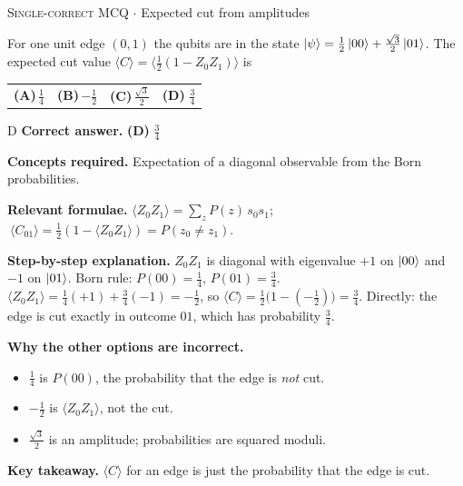\documentclass[11pt,a4paper]{article}
\newcommand{\optlabel}[1]{\textbf{(#1)}}
\newcommand{\correctlabel}[1]{\textcolor{okgreen}{\textbf{(#1)}\,\ding{51}}}
\newenvironment{qitem}[1]{\begin{list}{}{\setlength{\leftmargin}{3.3em}\setlength{\labelwidth}{3.1em}%
  \setlength{\labelsep}{0.2em}\setlength{\topsep}{3pt}\setlength{\parsep}{3pt}}\item[\textbf{Q.#1}\hfill]}{\end{list}}
\newcommand{\qsep}{\par\vspace{2pt}{\color{black!15}\hrule}\vspace{4pt}}
\newcommand{\qmeta}[2]{{\footnotesize\color{black!60}\textsc{#1} \;$\cdot$\; #2}\par}
\begin{document}
\begin{qitem}{25}
\qmeta{Single-correct MCQ}{Expected cut from amplitudes}
For one unit edge $(0,1)$ the qubits are in the state $\ket\psi = \tfrac12\ket{00} + \tfrac{\sqrt3}{2}\ket{01}$. The expected
cut value $\langle C\rangle = \big\langle \tfrac12(1 - Z_0Z_1)\big\rangle$ is
\par\smallskip\noindent\begin{tabularx}{\linewidth}{@{}*{4}{L}@{}}
\optlabel{A}\,$\tfrac14$ & \optlabel{B}\,$-\tfrac12$ & \optlabel{C}\,$\tfrac{\sqrt3}{2}$ & \correctlabel{D}\,$\tfrac34$
\end{tabularx}
\end{qitem}
\begin{solbox}{D}
\textbf{\color{brand}Correct answer.} \textcolor{okgreen}{\textbf{(D)}} $\tfrac34$

\textbf{\color{brand}Concepts required.} Expectation of a diagonal observable from the Born probabilities.

\textbf{\color{brand}Relevant formulae.} $\langle Z_0Z_1\rangle = \sum_z P(z)\,s_0s_1$; $\ \langle C_{01}\rangle = \tfrac12(1 - \langle Z_0Z_1\rangle) = P(z_0\neq z_1)$.

\textbf{\color{brand}Step-by-step explanation.} $Z_0Z_1$ is diagonal with eigenvalue $+1$ on $\ket{00}$ and $-1$ on $\ket{01}$. Born rule: $P(00) = \tfrac14$, $P(01) = \tfrac34$.
$\langle Z_0Z_1\rangle = \tfrac14(+1) + \tfrac34(-1) = -\tfrac12$, so $\langle C\rangle = \tfrac12\big(1 - (-\tfrac12)\big) = \tfrac34$.
Directly: the edge is cut exactly in outcome $01$, which has probability $\tfrac34$.

\textbf{\color{brand}Why the other options are incorrect.}
\begin{itemize}[leftmargin=2.4em, itemsep=1pt, topsep=2pt]
\item[\textbf{(A)}] $\frac14$ is $P(00)$, the probability that the edge is \emph{not} cut.
\item[\textbf{(B)}] $-\frac12$ is $\langle Z_0Z_1\rangle$, not the cut.
\item[\textbf{(C)}] $\frac{\sqrt3}{2}$ is an amplitude; probabilities are squared moduli.
\end{itemize}
\textbf{\color{brand}Key takeaway.} $\langle C\rangle$ for an edge is just the probability that the edge is cut.
\end{solbox}
\qsep
\end{document}

